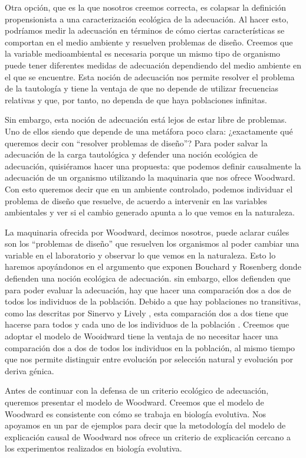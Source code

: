 Otra opción, que es la que nosotros creemos correcta, es colapsar la definición propensionista a una caracterización ecológica de la adecuación. Al hacer esto, podríamos medir la adecuación en términos de cómo ciertas características se comportan en el medio ambiente y resuelven problemas de diseño\cite{sep-fitness}. Creemos que la variable medioambiental es necesaria porque un mismo tipo de organismo puede tener diferentes medidas de adecuación dependiendo del medio ambiente en el que se encuentre.  Esta noción de adecuación nos permite resolver el problema de la tautología y tiene la ventaja de que no depende de utilizar frecuencias relativas y que, por tanto, no dependa de que haya poblaciones infinitas.

Sin embargo, esta noción de adecuación está lejos de estar libre de problemas. Uno de ellos siendo que depende de una metáfora poco clara: ¿exactamente qué queremos decir con ``resolver problemas de diseño''? Para poder salvar la adecuación de la carga tautológica y defender una noción ecológica de adecuación, quisiéramos hacer una propuesta: que podemos definir causalmente la adecuación de un organismo utilizando la maquinaria que nos ofrece Woodward. Con esto queremos decir que en un ambiente controlado, podemos individuar el problema de diseño que resuelve, de acuerdo a intervenir en las variables ambientales y ver si el cambio generado apunta a lo que vemos en la naturaleza.

La maquinaria ofrecida por Woodward, decimos nosotros, puede aclarar cuáles son los ``problemas de diseño'' que resuelven los organismos al poder cambiar una variable en el laboratorio y observar lo que vemos en la naturaleza. Esto lo haremos apoyándonos en el argumento que exponen Bouchard y Rosenberg \citeyear{Bouchard2004} donde defienden una noción ecológica de adecuación. sin embargo, ellos defienden que para poder evaluar la adecuación, hay que hacer una comparación dos a dos de todos los individuos de la población. Debido a que hay poblaciones no transitivas, como las descritas por Sinervo y Lively \cite{Sinervo1996}, esta comparación dos a dos tiene que hacerse para todos y cada uno de los individuos de la población \cite{Millstein2006}. Creemos que adoptar el modelo de Wooidward tiene la ventaja de no necesitar hacer una comparación dos a dos de todos los individuos en la población, al mismo tiempo que nos permite distinguir entre evolución por selección natural y evolución por deriva génica.

Antes de continuar con la defensa de un criterio ecológico de adecuación, queremos presentar el modelo de Woodward. Creemos que el modelo de Woodward es consistente con cómo se trabaja en biología evolutiva. Nos apoyamos en un par de ejemplos para decir que la metodología del modelo de explicación causal de Woodward  nos ofrece un criterio de explicación cercano a los experimentos realizados en biología evolutiva.

